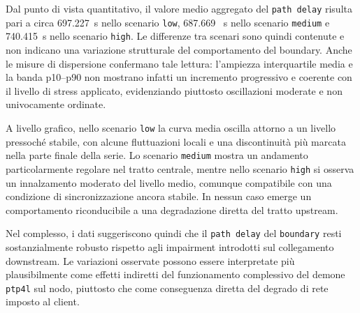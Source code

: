 Dal punto di vista quantitativo, il valore medio aggregato del \texttt{path
delay} risulta pari a circa 697.227~\textmu s nello scenario \texttt{low}, 687.669~\textmu
s nello scenario \texttt{medium} e 740.415~\textmu s nello scenario \texttt{high}.
Le differenze tra scenari sono quindi contenute e non indicano una variazione
strutturale del comportamento del boundary. Anche le misure di dispersione confermano
tale lettura: l'ampiezza interquartile media e la banda p10--p90 non mostrano infatti
un incremento progressivo e coerente con il livello di stress applicato,
evidenziando piuttosto oscillazioni moderate e non univocamente ordinate.

A livello grafico, nello scenario \texttt{low} la curva media oscilla attorno a
un livello pressoché stabile, con alcune fluttuazioni locali e una discontinuità più
marcata nella parte finale della serie. Lo scenario \texttt{medium} mostra un andamento
particolarmente regolare nel tratto centrale, mentre nello scenario \texttt{high}
si osserva un innalzamento moderato del livello medio, comunque compatibile con
una condizione di sincronizzazione ancora stabile. In nessun caso emerge un comportamento
riconducibile a una degradazione diretta del tratto upstream.

Nel complesso, i dati suggeriscono quindi che il \texttt{path delay} del \texttt{boundary}
resti sostanzialmente robusto rispetto agli impairment introdotti sul
collegamento downstream. Le variazioni osservate possono essere interpretate più plausibilmente
come effetti indiretti del funzionamento complessivo del demone \texttt{ptp4l}
sul nodo, piuttosto che come conseguenza diretta del degrado di rete imposto al client.

